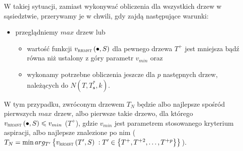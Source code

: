 W takiej sytuacji, zamiast wykonywać obliczenia dla wszystkich drzew w sąsiedztwie, przerywamy je w chwili, gdy zajdą następujące warunki:

\begin{itemize}
	\item przeglądniemy $max$ drzew lub
	\begin{itemize}
		\item wartość funkcji $v_{\textsc{rrmst}} \left( \bullet, S \right)$ dla pewnego drzewa $T^{+}$ jest mniejsza bądź równa niż ustalony z góry parametr $v_{min}$ oraz
		\item wykonamy potrzebne obliczenia jeszcze dla $p$ następnych drzew, należących do $N \left( T, T^{\ast}_{\textbf{s}}, k \right)$.
	\end{itemize}
\end{itemize}

W tym przypadku, zwróconym drzewem $T_{N}$ będzie albo najlepsze spośród pierwszych $max$ drzew, albo pierwsze takie drzewo, dla którego $v_{\textsc{rrmst}} \left( \bullet, S \right) \leqslant v_{min}$ ($T^{+}$), gdzie $v_{min}$ jest parametrem stosowanego kryterium aspiracji, albo najlepsze znalezione po nim ($T_{N} = \min arg_{T^{\prime}} \left\{ v_{\textsc{rrmst}} \left( T^{\prime}, S \right) \; : T^{\prime} \in \left\{ T^{+}, T^{+2}, \dots, T^{+p} \right\} \right\}$).

